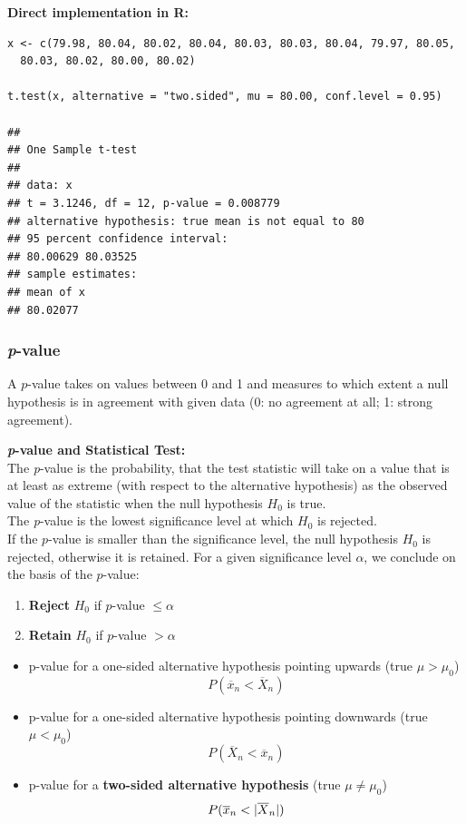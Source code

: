 \documentclass[11pt]{article}
\newcommand*\samplemean[1]{\overline{#1}}
\DeclarePairedDelimiter\abs{\lvert}{\rvert}
\begin{document}
\newpage
\noindent
\textbf{Direct implementation in R:}
\begin{verbatim}
x <- c(79.98, 80.04, 80.02, 80.04, 80.03, 80.03, 80.04, 79.97, 80.05, 
  80.03, 80.02, 80.00, 80.02)

t.test(x, alternative = "two.sided", mu = 80.00, conf.level = 0.95)

##
## One Sample t-test
##
## data: x
## t = 3.1246, df = 12, p-value = 0.008779
## alternative hypothesis: true mean is not equal to 80
## 95 percent confidence interval:
## 80.00629 80.03525
## sample estimates:
## mean of x
## 80.02077
\end{verbatim}


\subsubsection{\textit{p}-value}
A $p$-value takes on values between 0 and 1 and measures to which extent a null hypothesis
is in agreement with given data (0: no agreement at all; 1: strong agreement).

\begin{definition}
	\textbf{\textit{p}-value and Statistical Test:}\\
	The \textit{p}-value is the probability, that the test statistic will take on a value that is at least as extreme (with respect to the alternative hypothesis) as the observed value of the statistic when the null hypothesis $H_0$ is true.\\
	The \textit{p}-value is the lowest significance level at which $H_0$ is rejected.\\
	
	\noindent
	If the $p$-value is smaller than the significance level, the null hypothesis $H_0$ is rejected, otherwise it is retained. For a given significance level $\alpha$, we conclude on the basis of the $p$-value:
	\begin{enumerate}
		\item \textbf{Reject} $H_0$ if $p$-value $\leq \alpha$
		\item \textbf{Retain} $H_0$ if $p$-value $> \alpha$
	\end{enumerate}
\end{definition}
\begin{itemize}
	\item p-value for a one-sided alternative hypothesis pointing upwards (true $\mu > \mu_0$)
	\begin{equation*}
		P(\samplemean{x}_{n} < \samplemean{X}_{n})
	\end{equation*}
	\item p-value for a one-sided alternative hypothesis pointing downwards (true $\mu < \mu_0$)
	\begin{equation*}
		P(\samplemean{X}_{n} < \samplemean{x}_{n})
	\end{equation*}
	\item p-value for a \textbf{two-sided alternative hypothesis} (true $\mu \neq \mu_0$)
	\begin{equation*}
		P(\samplemean{x}_{n} < \abs{\samplemean{X}_{n}})
	\end{equation*}
\end{itemize}
\end{document}
